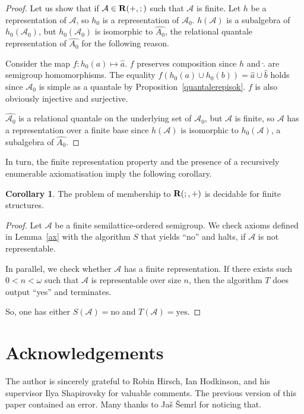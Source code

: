 \documentclass[a4paper]{article}
\theoremstyle{definition}
\theoremstyle{theorem}
\theoremstyle{proposition}
\theoremstyle{lemma}
\theoremstyle{ex}
\theoremstyle{corollary}
\newtheorem{corollary}{Corollary}
\theoremstyle{claim}
\begin{document}
\begin{proof}
  Let us show that if $\mathcal{A} \in {\bf R}(+, ;)$ such that $\mathcal{A}$ is finite. Let $h$ be a representation of $\mathcal{A}$, so $h_0$ is a representation of $\mathcal{A}_0$.
  $h(\mathcal{A})$ is a subalgebra of $h_0(\mathcal{A}_0)$, but
  $h_0(\mathcal{A}_0)$ is isomorphic to $\widehat{A_0}$, the relational quantale representation of $\widehat{A_0}$ for the following reason.

  Consider the map
  $f : h_0(a) \mapsto \hat{a}$. $f$ preserves composition since $h$ and $\hat{.}$ are semigroup homomorphisms. The equality $f(h_0(a) \cup h_0(b)) = \hat{a} \cup \hat{b}$ holds since $\mathcal{A}_0$ is simple as a quantale by Proposition~\ref{quantalerepisok}. $f$ is also obviously injective and surjective.

  $\widehat{\mathcal{A}_0}$ is a relational quantale on the underlying set of $\mathcal{A}_0$, but $\mathcal{A}$ is finite, so $\mathcal{A}$ has a representation over a finite base since $h(\mathcal{A})$ is isomorphic to $h_0(\mathcal{A})$, a subalgebra of $\widehat{A_0}$.
\end{proof}

In turn, the finite representation property and the presence of a recursively enumerable axiomatisation imply the following corollary.

\begin{corollary}
  The problem of membership to ${\bf R}(;, +)$ is decidable for finite structures.
\end{corollary}

\begin{proof}
  Let $\mathcal{A}$ be a finite semilattice-ordered semigroup. We check axioms defined in Lemma~\ref{ax} with the algorithm $S$ that yields ``no'' and halts, if $\mathcal{A}$ is not representable.

  In parallel, we check whether $\mathcal{A}$ has a finite representation. If there exists such $0 < n < \omega$ such that $\mathcal{A}$ is representable over size $n$, then the algorithm $T$ does output ``yes'' and terminates.

  So, one has either $S(\mathcal{A}) = \text{no}$ and $T(\mathcal{A}) = \text{yes}$.
\end{proof}


\section{Acknowledgements}

The author is sincerely grateful to Robin Hirsch, Ian Hodkinson, and his supervisor Ilya Shapirovsky for valuable comments. The previous version of this paper contained an error. Many thanks to Ja\v{s} \v{S}emrl for noticing that.



\end{document}

